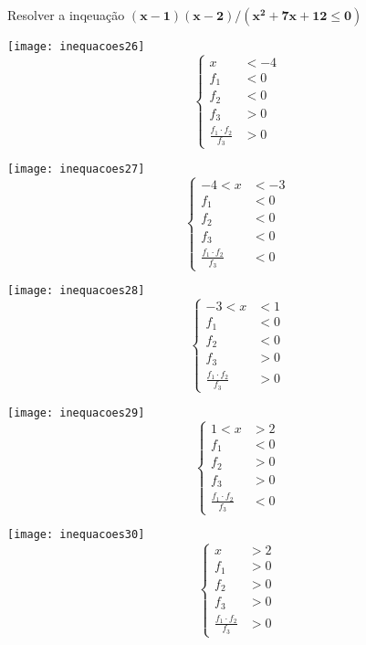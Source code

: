 \begin{example}{Resolver a inqeuação $\bm{(x-1)(x-2)/(x^2+7x+12\leq0)}$}
\begin{multicols}{5}
\centering

\texttt{[image: inequacoes26]}
\begin{equation*}
\left \{
\begin{aligned}
x&<-4\\
f_1&<0\\
f_2&<0\\
f_3&>0\\
\frac{f_1\cdot f_2}{f_3}&>0
\end{aligned}
\right.
\end{equation*}


\texttt{[image: inequacoes27]}
\begin{equation*}
\left \{
\begin{aligned}
-4<x&<-3\\
f_1&<0\\
f_2&<0\\
f_3&<0\\
\frac{f_1\cdot f_2}{f_3}&<0
\end{aligned}
\right.
\end{equation*}


\texttt{[image: inequacoes28]}
\begin{equation*}
\left \{
\begin{aligned}
-3<x&<1\\
f_1&<0\\
f_2&<0\\
f_3&>0\\
\frac{f_1\cdot f_2}{f_3}&>0
\end{aligned}
\right.
\end{equation*}


\texttt{[image: inequacoes29]}
\begin{equation*}
\left \{
\begin{aligned}
1<x&>2\\
f_1&<0\\
f_2&>0\\
f_3&>0\\
\frac{f_1\cdot f_2}{f_3}&<0
\end{aligned}
\right.
\end{equation*}

\texttt{[image: inequacoes30]}
\begin{equation*}
\left \{
\begin{aligned}
x&>2\\
f_1&>0\\
f_2&>0\\
f_3&>0\\
\frac{f_1\cdot f_2}{f_3}&>0
\end{aligned}
\right.
\end{equation*}


\end{multicols}
\end{example}
